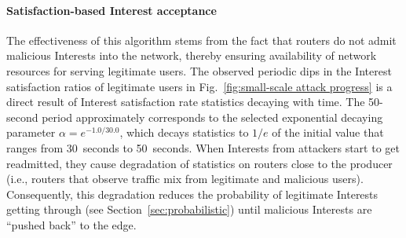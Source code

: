 
\paragraph{\textbf{Satisfaction-based Interest acceptance}}

The effectiveness of this algorithm stems from the fact that routers do not admit malicious Interests into the network, thereby ensuring availability of network resources for serving legitimate users. The observed periodic dips in the Interest satisfaction ratios of legitimate users in Fig.~\ref{fig:small-scale attack progress} is a direct result of Interest satisfaction rate statistics decaying with time. The 50-second period approximately corresponds to the selected exponential decaying parameter $\alpha=e^{−1.0/30.0}$, which decays statistics to $1/e$ of the initial value that ranges from 30~seconds to 50~seconds. 
When Interests from attackers start to get readmitted, they cause degradation of statistics on routers close to the producer (i.e., routers that observe traffic mix from legitimate and malicious users). Consequently, this degradation reduces the probability of legitimate Interests getting through (see Section~\ref{sec:probabilistic}) until malicious Interests are ``pushed back'' to the edge.



